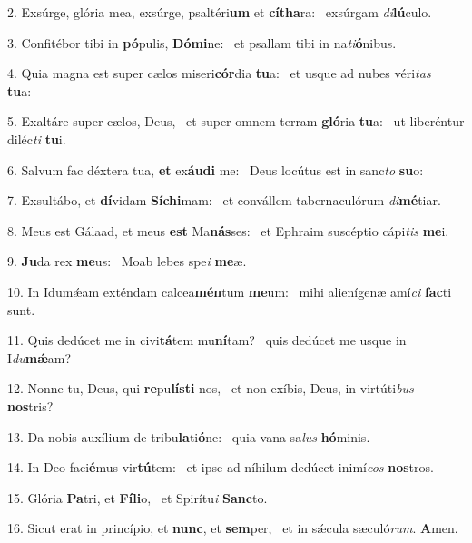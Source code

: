 2. Exsúrge, glória mea, exsúrge, psaltéri\textbf{um} et \textbf{cí}\textbf{tha}ra: \ast\  exsúrgam \textit{di}\textbf{lú}culo.\

3. Confitébor tibi in \textbf{pó}pulis, \textbf{Dó}\textbf{mi}ne: \ast\  et psallam tibi in na\textit{ti}\textbf{ó}nibus.\

4. Quia magna est super cælos miseri\textbf{cór}dia \textbf{tu}a: \ast\  et usque ad nubes véri\textit{tas} \textbf{tu}a:\

5. Exaltáre super cælos, Deus, \dag\  et super omnem terram \textbf{gló}ria \textbf{tu}a: \ast\  ut liberéntur diléc\textit{ti} \textbf{tu}i.\

6. Salvum fac déxtera tua, \textbf{et} ex\textbf{áu}\textbf{di} me: \ast\  Deus locútus est in sanc\textit{to} \textbf{su}o:\

7. Exsultábo, et \textbf{dí}vidam \textbf{Sí}\textbf{chi}mam: \ast\  et convállem tabernaculórum \textit{di}\textbf{mé}tiar.\

8. Meus est Gálaad, et meus \textbf{est} Ma\textbf{nás}ses: \ast\  et Ephraim suscéptio cápi\textit{tis} \textbf{me}i.\

9. \textbf{Ju}da rex \textbf{me}us: \ast\  Moab lebes spe\textit{i} \textbf{me}æ.\

10. In Idumǽam exténdam calcea\textbf{mén}tum \textbf{me}um: \ast\  mihi alienígenæ amí\textit{ci} \textbf{fac}ti sunt.\

11. Quis dedúcet me in civi\textbf{tá}tem mu\textbf{ní}tam? \ast\  quis dedúcet me usque in I\textit{du}\textbf{mǽ}am?\

12. Nonne tu, Deus, qui \textbf{re}pu\textbf{lís}\textbf{ti} nos, \ast\  et non exíbis, Deus, in virtúti\textit{bus} \textbf{nos}tris?\

13. Da nobis auxílium de tribu\textbf{la}ti\textbf{ó}ne: \ast\  quia vana sa\textit{lus} \textbf{hó}minis.\

14. In Deo faci\textbf{é}mus vir\textbf{tú}tem: \ast\  et ipse ad níhilum dedúcet inimí\textit{cos} \textbf{nos}tros.\

15. Glória \textbf{Pa}tri, et \textbf{Fí}\textbf{li}o, \ast\  et Spirítu\textit{i} \textbf{Sanc}to.\

16. Sicut erat in princípio, et \textbf{nunc}, et \textbf{sem}per, \ast\  et in sǽcula sæculó\textit{rum}. \textbf{A}men.\


